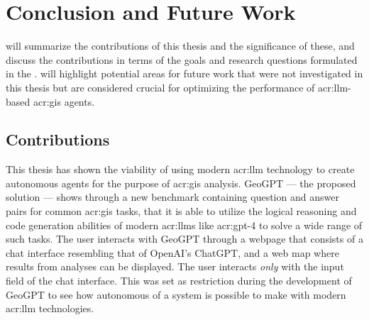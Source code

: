 \chapter{Conclusion and Future Work}
\label{cha:conclusion}

 will summarize the contributions of this thesis and the significance of these, and discuss the contributions in terms of the goals and research questions formulated in the .  will highlight potential areas for future work that were not investigated in this thesis but are considered crucial for optimizing the performance of \acrshort{acr:llm}-based \acrshort{acr:gis} agents.

\section{Contributions}
\label{sec:contributions}

\begin{comment}
What are the main contributions made to the field?
How significant are these contributions?
Also discuss the contributions in terms of the goals and research questions formulated in the Introduction.

The contributions section will normally contain everything that you address in the abstract, but in an extended form and quite possibly additional issues that cannot be included in the abstract.
An obvious difference is that when the reader has come this far in the text, she/he should be quite familiar with the work, but while reading the abstract they will have little to no knowledge of the work.

The section ``Contributions'' in Chapter~\ref{cha:introduction} differs from this one in that the former is just a list of the main bits, while this section should explain them in more detail.
However, basically the same items should appear in both sections.
\end{comment}

This thesis has shown the viability of using modern \gls{acr:llm} technology to create autonomous agents for the purpose of \acrshort{acr:gis} analysis. GeoGPT --- the proposed solution --- shows through a new benchmark containing question and answer pairs for common \acrshort{acr:gis} tasks, that it is able to utilize the logical reasoning and code generation abilities of modern \glspl{acr:llm} like \acrshort{acr:gpt}-4 to solve a wide range of such tasks. The user interacts with GeoGPT through a webpage that consists of a chat interface resembling that of OpenAI's ChatGPT, and a web map where results from analyses can be displayed. The user interacts \textit{only} with the input field of the chat interface. This was set as restriction during the development of GeoGPT to see how autonomous of a system is possible to make with modern \acrshort{acr:llm} technologies.

